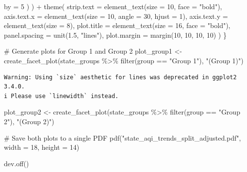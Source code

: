 \documentclass[
  12pt,
]{article}
\newenvironment{Shaded}{\begin{snugshade}}{\end{snugshade}}
\newcommand{\AttributeTok}[1]{\textcolor[rgb]{0.40,0.45,0.13}{#1}}
\newcommand{\CommentTok}[1]{\textcolor[rgb]{0.37,0.37,0.37}{#1}}
\newcommand{\DecValTok}[1]{\textcolor[rgb]{0.68,0.00,0.00}{#1}}
\newcommand{\FloatTok}[1]{\textcolor[rgb]{0.68,0.00,0.00}{#1}}
\newcommand{\FunctionTok}[1]{\textcolor[rgb]{0.28,0.35,0.67}{#1}}
\newcommand{\NormalTok}[1]{\textcolor[rgb]{0.00,0.23,0.31}{#1}}
\newcommand{\OtherTok}[1]{\textcolor[rgb]{0.00,0.23,0.31}{#1}}
\newcommand{\SpecialCharTok}[1]{\textcolor[rgb]{0.37,0.37,0.37}{#1}}
\newcommand{\StringTok}[1]{\textcolor[rgb]{0.13,0.47,0.30}{#1}}
\begin{document}
\begin{Shaded}
\begin{Highlighting}[]
        \AttributeTok{by =} \DecValTok{5}
\NormalTok{      )}
\NormalTok{    ) }\SpecialCharTok{+}
    \FunctionTok{theme}\NormalTok{(}
      \AttributeTok{strip.text =} \FunctionTok{element\_text}\NormalTok{(}\AttributeTok{size =} \DecValTok{10}\NormalTok{, }\AttributeTok{face =} \StringTok{"bold"}\NormalTok{),}
      \AttributeTok{axis.text.x =} \FunctionTok{element\_text}\NormalTok{(}\AttributeTok{size =} \DecValTok{10}\NormalTok{, }\AttributeTok{angle =} \DecValTok{30}\NormalTok{, }\AttributeTok{hjust =} \DecValTok{1}\NormalTok{),}
      \AttributeTok{axis.text.y =} \FunctionTok{element\_text}\NormalTok{(}\AttributeTok{size =} \DecValTok{8}\NormalTok{),}
      \AttributeTok{plot.title =} \FunctionTok{element\_text}\NormalTok{(}\AttributeTok{size =} \DecValTok{16}\NormalTok{, }\AttributeTok{face =} \StringTok{"bold"}\NormalTok{),}
      \AttributeTok{panel.spacing =} \FunctionTok{unit}\NormalTok{(}\FloatTok{1.5}\NormalTok{, }\StringTok{"lines"}\NormalTok{),}
      \AttributeTok{plot.margin =} \FunctionTok{margin}\NormalTok{(}\DecValTok{10}\NormalTok{, }\DecValTok{10}\NormalTok{, }\DecValTok{10}\NormalTok{, }\DecValTok{10}\NormalTok{)}
\NormalTok{    )}
\NormalTok{\}}

\CommentTok{\# Generate plots for Group 1 and Group 2}
\NormalTok{plot\_group1 }\OtherTok{\textless{}{-}} \FunctionTok{create\_facet\_plot}\NormalTok{(state\_groups }\SpecialCharTok{\%\textgreater{}\%} \FunctionTok{filter}\NormalTok{(group }\SpecialCharTok{==} \StringTok{"Group 1"}\NormalTok{), }\StringTok{"(Group 1)"}\NormalTok{)}
\end{Highlighting}
\end{Shaded}

\begin{verbatim}
Warning: Using `size` aesthetic for lines was deprecated in ggplot2 3.4.0.
i Please use `linewidth` instead.
\end{verbatim}

\begin{Shaded}
\begin{Highlighting}[]
\NormalTok{plot\_group2 }\OtherTok{\textless{}{-}} \FunctionTok{create\_facet\_plot}\NormalTok{(state\_groups }\SpecialCharTok{\%\textgreater{}\%} \FunctionTok{filter}\NormalTok{(group }\SpecialCharTok{==} \StringTok{"Group 2"}\NormalTok{), }\StringTok{"(Group 2)"}\NormalTok{)}

\CommentTok{\# Save both plots to a single PDF}
\FunctionTok{pdf}\NormalTok{(}\StringTok{"state\_aqi\_trends\_split\_adjusted.pdf"}\NormalTok{, }\AttributeTok{width =} \DecValTok{18}\NormalTok{, }\AttributeTok{height =} \DecValTok{14}\NormalTok{)}

\FunctionTok{dev.off}\NormalTok{()}
\end{Highlighting}
\end{Shaded}
\end{document}
